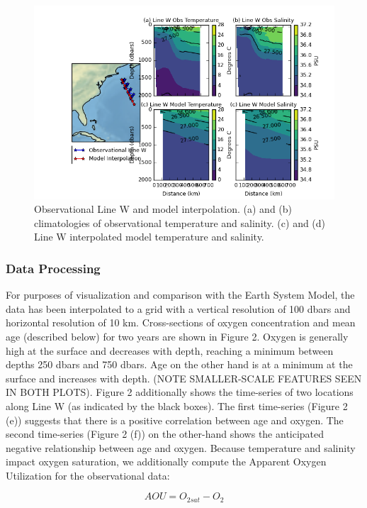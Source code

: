 \begin{figure}
\centering
\includegraphics[width=\linewidth]{linew_interpolation.png}
\caption{Observational Line W and model interpolation. (a) and (b) climatologies of observational temperature and salinity. (c) and (d) Line W interpolated model temperature and salinity.}
\label{fig:fig1}
\end{figure}

\subsubsection{Data Processing}
For purposes of visualization and comparison with the Earth System Model, the data has been interpolated to a grid with a vertical resolution of 100 dbars and horizontal resolution of 10 km. Cross-sections of oxygen concentration and mean age (described below) for two years are shown in Figure 2. Oxygen is generally high at the surface and decreases with depth, reaching a minimum between depths 250 dbars and 750 dbars. Age on the other hand is at a minimum at the surface and increases with depth. (NOTE SMALLER-SCALE FEATURES SEEN IN BOTH PLOTS). Figure 2 additionally shows the time-series of two locations along Line W (as indicated by the black boxes). The first time-series (Figure 2 (e)) suggests that there is a positive correlation between age and oxygen. The second time-series (Figure 2 (f)) on the other-hand shows the anticipated negative relationship between age and oxygen.
Because temperature and salinity impact oxygen saturation, we additionally compute the Apparent Oxygen Utilization for the observational data:

\begin{equation}
AOU = O_{2 sat} - O_2
\end{equation}

